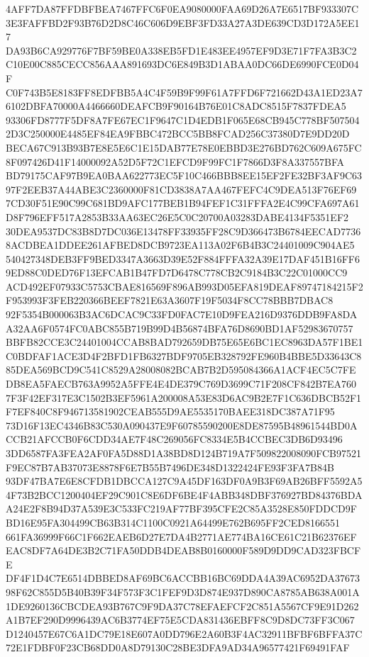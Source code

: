 \documentclass[UTF8,fontset=fandol,zihao=-4,a4paper]{ctexart}
\begin{document}
{{4AFF7DA87FFDBFBEA7467FFC6F0EA9080000FAA69D26A7E6517BF933307C3E3FAFFBD2F93B76D2D8C46C606D9EBF3FD33A27A3DE639CD3D172A5EE17
DA93B6CA929776F7BF59BE0A338EB5FD1E483EE4957EF9D3E71F7FA3B3C2C10E00C885CECC856AAA891693DC6E849B3D1ABAA0DC66DE6990FCE0D04F
C0F743B5E8183FF8EDFBB5A4C4F59B9F99F61A7FFD6F721662D43A1ED23A76102DBFA70000A4466660DEAFCB9F90164B76E01C8ADC8515F7837FDEA5
93306FD8777F5DF8A7FE67EC1F9647C1D4EDB1F065E68CB945C778BF5075042D3C250000E4485EF84EA9FBBC472BCC5BB8FCAD256C37380D7E9DD20D
BECA67C913B93B7E8E5E6C1E15DAB77E78E0EBBD3E276BD762C609A675FC8F097426D41F14000092A52D5F72C1EFCD9F99FC1F7866D3F8A337557BFA
BD79175CAF97B9EA0BAA622773EC5F10C466BBB8EE15EF2FE32BF3AF9C6397F2EEB37A44ABE3C2360000F81CD3838A7AA467FEFC4C9DEA513F76EF69
7CD30F51E90C99C681BD9AFC177BEB1B94FEF1C31FFFA2E4C99CFA697A61D8F796EFF517A2853B33AA63EC26E5C0C20700A03283DABE4134F5351EF2
30DEA9537DC83B8D7DC036E13478FF33935FF28C9D366473B6784EECAD77368ACDBEA1DDEE261AFBED8DCB9723EA113A02F6B4B3C24401009C904AE5
540427348DEB3FF9BED3347A3663D39E52F884FFFA32A39E17DAF451B16FF69ED88C0DED76F13EFCAB1B47FD7D6478C778CB2C9184B3C22C01000CC9
ACD492EF07933C5753CBAE816569F896AB993D05EFA819DEAF89747184215F2F953993F3FEB220366BEEF7821E63A3607F19F5034F8CC78BBB7DBAC8
92F5354B000063B3AC6DCAC9C33FD0FAC7E10D9FEA216D9376DDB9FA8DAA32AA6F0574FC0ABC855B719B99D4B56874BFA76D8690BD1AF52983670757
BBFB82CCE3C24401004CCAB8BAD792659DB75E65E6BC1EC8963DA57F1BE1C0BDFAF1ACE3D4F2BFD1FB6327BDF9705EB328792FE960B4BBE5D33643C8
85DEA569BCD9C541C8529A28008082BCAB7B2D595084366A1ACF4EC5C7FEDB8EA5FAECB763A9952A5FFE4E4DE379C769D3699C71F208CF842B7EA760
7F3F42EF317E3C1502B3EF5961A200008A53E83D6AC9B2E7F1C636DBCB52F1F7EF840C8F946713581902CEAB555D9AE5535170BAEE318DC387A71F95
73D16F13EC4346B83C530A090437E9F60785590200E8DE87595B48961544BD0ACCB21AFCCB0F6CDD34AE7F48C269056FC8334E5B4CCBEC3DB6D93496
3DD6587FA3FEA2AF0FA5D88D1A38BD8D124B719A7F509822008090FCB97521F9EC87B7AB37073E8878F6E7B55B7496DE348D1322424FE93F3FA7B84B
93DF47BA7E6E8CFDB1DBCCA127C9A45DF163DF0A9B3F69AB26BFF5592A54F73B2BCC1200404EF29C901C8E6DF6BE4F4ABB348DBF376927BD84376BDA
A24E2F8B94D37A539E3C533FC219AF77BF395CFE2C85A3528E850FDDCD9FBD16E95FA304499CB63B314C1100C0921A64499E762B695FF2CED8166551
661FA36999F66C1F662EAEB6D27E7DA4B2771AE774BA16CE61C21B62376EFEAC8DF7A64DE3B2C71FA50DDB4DEAB8B0160000F589D9DD9CAD323FBCFE
DF4F1D4C7E6514DBBED8AF69BC6ACCBB16BC69DDA4A39AC6952DA3767398F62C855D5B40B39F34F573F3C1FEF9D3D874E937D890CA8785AB638A001A
1DE9260136CBCDEA93B767C9F9DA37C78EFAEFCF2C851A5567CF9E91D262A1B7EF290D9996439AC6B3774EF75E5CDA831436EBFF8C9D8DC73FF3C067
D1240457E67C6A1DC79E18E607A0DD796E2A60B3F4AC32911BFBF6BFFA37C72E1FDBF0F23CB68DD0A8D79130C28BE3DFA9AD34A96577421F69491FAF
}}
\end{document}
